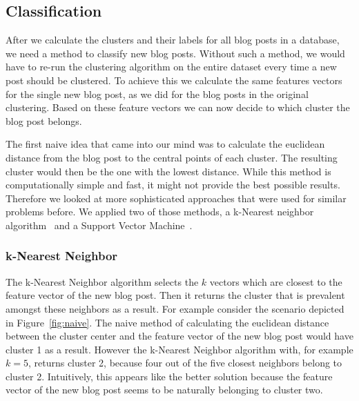 
\subsection{Classification}
\label{sec:classification}

After we calculate the clusters and their labels for all blog posts in a database, we need a method to classify new blog posts.
Without such a method, we would have to re-run the clustering algorithm on the entire dataset every time a new post should be clustered.
To achieve this we calculate the same features vectors for the single new blog post, as we did for the blog posts in the original clustering.
Based on these feature vectors we can now decide to which cluster the blog post belongs.


The first naive idea that came into our mind was to calculate the euclidean distance from the blog post to the central points of each cluster.
The resulting cluster would then be the one with the lowest distance.
While this method is computationally simple and fast, it might not provide the best possible results.
Therefore we looked at more sophisticated approaches that were used for similar problems before.
We applied two of those methods, a k-Nearest neighbor algorithm~\cite{peterson2009k} and a Support Vector Machine~\cite{kolari2006svms}.


\subsubsection{k-Nearest Neighbor}
\label{sec:k_nearest_neighbor}


The k-Nearest Neighbor algorithm selects the $k$ vectors which are closest to the feature vector of the new blog post.
Then it returns the cluster that is prevalent amongst these neighbors as a result.
For example consider the scenario depicted in Figure~\ref{fig:naive}.
The naive method of calculating the euclidean distance between the cluster center and the feature vector of the new blog post would have cluster 1 as a result.
However the k-Nearest Neighbor algorithm with, for example $k=5$, returns cluster 2, because four out of the five closest neighbors belong to cluster 2.
Intuitively, this appears like the better solution because the feature vector of the new blog post seems to be naturally belonging to cluster two.


